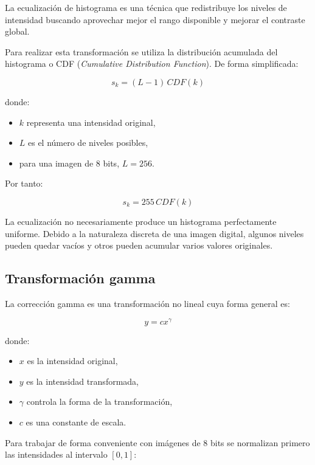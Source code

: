\documentclass[11pt,letterpaper]{article}
\begin{document}
La ecualización de histograma es una técnica que redistribuye los niveles de intensidad buscando aprovechar mejor el rango disponible y mejorar el contraste global.

Para realizar esta transformación se utiliza la distribución acumulada del histograma o CDF (\textit{Cumulative Distribution Function}). De forma simplificada:

\begin{equation}
s_k=(L-1)\,CDF(k)
\end{equation}

donde:

\begin{itemize}
    \item $k$ representa una intensidad original,
    \item $L$ es el número de niveles posibles,
    \item para una imagen de 8 bits, $L=256$.
\end{itemize}

Por tanto:

\begin{equation}
s_k=255\,CDF(k)
\end{equation}

La ecualización no necesariamente produce un histograma perfectamente uniforme. Debido a la naturaleza discreta de una imagen digital, algunos niveles pueden quedar vacíos y otros pueden acumular varios valores originales.


\subsection{Transformación gamma}

La corrección gamma es una transformación no lineal cuya forma general es:

\begin{equation}
y=cx^\gamma
\end{equation}

donde:

\begin{itemize}
    \item $x$ es la intensidad original,
    \item $y$ es la intensidad transformada,
    \item $\gamma$ controla la forma de la transformación,
    \item $c$ es una constante de escala.
\end{itemize}

Para trabajar de forma conveniente con imágenes de 8 bits se normalizan primero las intensidades al intervalo $[0,1]$:
\end{document}
